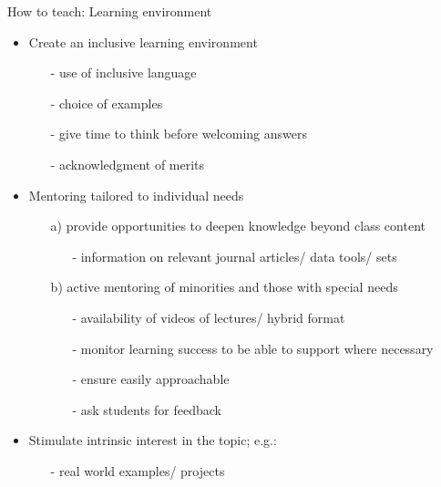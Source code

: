 \begin{frame}{How to teach: Learning environment} %
	\vspace{-2.5mm}
	\begin{itemize}%
		\item<+-> Create an \alert{inclusive} learning environment %
		\begin{itemize}[<+->]
			\item[-] use of inclusive language
			\item[-] choice of examples
			\item[-] give time to think before welcoming answers
			\item[-] acknowledgment of merits
		\end{itemize}
	\vspace{1mm}
		\item<+-> \alert{Mentoring} tailored to \alert{individual needs}
		\begin{itemize}[<+->]
			\item[a)] provide opportunities to deepen knowledge beyond class content 
			\begin{itemize}
				\item[-] information on relevant journal articles/ data tools/ sets
			\end{itemize}
			\item[b)]  active mentoring of minorities and those with special needs
			\begin{itemize}
				\item[-] availability of videos of lectures/ hybrid format
				\item[-] monitor learning success to be able to support where necessary
				\item[-] ensure easily approachable %
				\item[-] ask students for feedback 
			\end{itemize}
		\end{itemize}		
		\vspace{1mm}		
		\item<+-> Stimulate \alert{intrinsic interest} in the topic; e.g.: 
		\begin{itemize}[<+->]
			\item[-] real world examples/ projects %
		\end{itemize}
	\end{itemize}
\end{frame}

